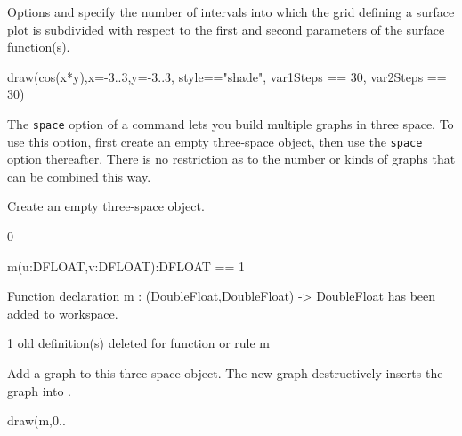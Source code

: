 %
%
%
\begin{psXtc}
\begin{xtccomment}
Options  and
 specify the number of intervals into
which the grid defining a surface plot is subdivided with respect to the
first and second parameters of the surface function(s).
\end{xtccomment}
\begin{spadsrc}
draw(cos(x*y),x=-3..3,y=-3..3, style=="shade", var1Steps == 30, var2Steps == 30)
\end{spadsrc}
\end{psXtc}
%
The {\tt space} option
of a  command lets you build multiple graphs in three space.
To use this option, first create an empty three-space object,
then use the {\tt space} option thereafter.
There is no restriction as to the number or kinds
of graphs that can be combined this way.
\begin{xtc}
\begin{xtccomment}
Create an empty three-space object.
\end{xtccomment}
\begin{TeXOutput}
\begin{fricasmath}{5}
0%
\end{fricasmath}
\end{TeXOutput}
\end{xtc}
%
%
\begin{xtc}
\begin{xtccomment}
\end{xtccomment}
\begin{spadsrc}
m(u:DFLOAT,v:DFLOAT):DFLOAT == 1 
\end{spadsrc}
\begin{MessageOutput}
   Function declaration m : (DoubleFloat,DoubleFloat) -> DoubleFloat 
      has been added to workspace.
\end{MessageOutput}
\begin{MessageOutput}
   1 old definition(s) deleted for function or rule m 
\end{MessageOutput}
\end{xtc}
\begin{psXtc}
\begin{xtccomment}
Add a graph to this three-space object.
The new graph destructively inserts the graph
into .
\end{xtccomment}
\begin{spadsrc}
draw(m,0..%
\end{spadsrc}
\end{psXtc}
